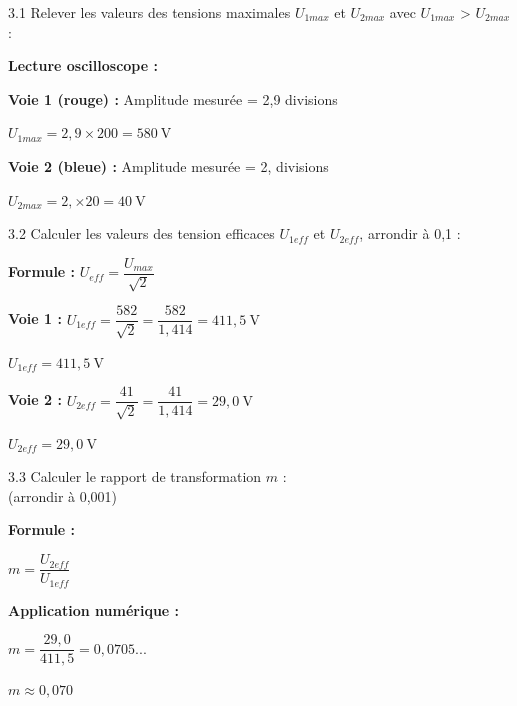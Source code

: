 \documentclass[11pt,a4paper]{article}
\begin{document}
3.1 Relever les valeurs des tensions maximales $U_{1 max}$ et $U_{2 max} $ avec $U_{1 max}$ > $U_{2 max}$ :

\begin{tcolorbox}[colback=red!5!white,colframe=red!75!black]
\textbf{Lecture oscilloscope :}

\vspace{2mm}

\textbf{Voie 1 (rouge) :} Amplitude mesurée = 2,9 divisions

$U_{1max} = 2,9 \times 200 = \boxed{580~\text{V}}$

\vspace{2mm}

\textbf{Voie 2 (bleue) :} Amplitude mesurée = 2, divisions

$U_{2max} = 2, \times 20 = \boxed{40~\text{V}}$
\end{tcolorbox}

 \newpage 
 
3.2 Calculer les valeurs des tension efficaces $U_{1 eff}$ et $U_{2 eff} $, arrondir à 0,1 : 

\begin{tcolorbox}[colback=red!5!white,colframe=red!75!black]
\textbf{Formule :} $U_{eff} = \dfrac{U_{max}}{\sqrt{2}}$

\vspace{2mm}

\textbf{Voie 1 :} $U_{1eff} = \dfrac{582}{\sqrt{2}} = \dfrac{582}{1,414} = 411,5~\text{V}$

$U_{1eff} = \boxed{411,5~\text{V}}$

\vspace{2mm}

\textbf{Voie 2 :} $U_{2eff} = \dfrac{41}{\sqrt{2}} = \dfrac{41}{1,414} = 29,0~\text{V}$

$U_{2eff} = \boxed{29,0~\text{V}}$
\end{tcolorbox}



\begin{minipage}{.50\textwidth}%
3.3 Calculer le rapport de transformation $m$ : \\(arrondir à 0,001) 
\end{minipage}%
\hfill
\begin{minipage}{.40\textwidth}%
\begin{tcolorbox}[colback=red!5!white,colframe=red!75!black]
\textbf{Formule :}

$m = \dfrac{U_{2eff}}{U_{1eff}}$

\vspace{2mm}

\textbf{Application numérique :}

$m = \dfrac{29,0}{411,5} = 0,0705...$

\vspace{2mm}

$m \approx \boxed{0,070}$
\end{tcolorbox}
\end{minipage}%
\end{document}
